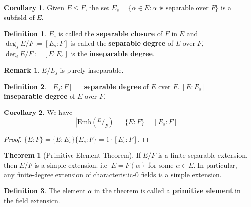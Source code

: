 \documentclass[12pt]{article}
\theoremstyle{definition}
\newtheorem{thm}{Theorem}
\newtheorem{dfn}{Definition}
\newtheorem{rem}{Remark}
\newtheorem{cor}{Corollary}
\newcommand*\quot[2]{{^{\textstyle #1}\big/_{\textstyle #2}}}
\begin{document}
\begin{cor}
	Given $E \leq \bar{F}$, the set $E_s = \{\alpha \in \bar{E}: \alpha \text{ is separable over }F\}$ is a subfield of $E$.
\end{cor}

\begin{dfn}
	$E_s$ is called the \textbf{separable closure} of $F$ in $E$ and $\deg_s E/F := [E_s:F]$ is called the \textbf{separable degree} of $E$ over $F$, $\deg_i E/F := [E:E_s]$ is the \textbf{inseparable degree}.
\end{dfn}

\begin{rem}
	$E/E_s$ is purely inseparable.
\end{rem}

\begin{dfn}
	$[E_s:F] = $ \textbf{separable degree} of $E$ over $F$.
	$[E:E_s] = $ \textbf{inseparable degree} of $E$ over $F$.
\end{dfn}

\begin{cor}
	We have
	\[
		\left|\text{Emb}(\quot{E}{F})\right| = \{E:F\} = [E_s:F]
	\]
\end{cor}

\begin{proof}
	$\{E:F\} = \{E:E_s\}\{E_s:F\} = 1 \cdot [E_s:F]$.
\end{proof}

\begin{thm}[Primitive Element Theorem]
	If $E/F$ is a finite separable extension, then $E/F$ is a simple extension.
	i.e. $E = F(\alpha)$ for some $\alpha \in E$.
	In particular, any finite-degree extension of characteristic-0 fields is a simple extension.
\end{thm}

\begin{dfn}
	The element $\alpha$ in the theorem is called a \textbf{primitive element} in the field extension.
\end{dfn}
\end{document}
